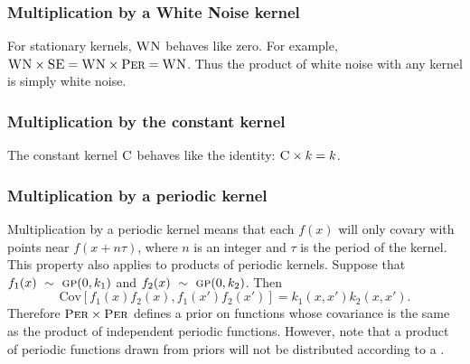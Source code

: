 \documentclass{article} %
\begin{document}
\subsubsection{Multiplication by a White Noise kernel}
\vspace{-0.08in}

For stationary kernels, ${\textsc{WN}}$ behaves like zero.  For example, ${\textsc{WN}} \times {\textsc{SE}} = {\textsc{WN}} \times {\textsc{Per}} = {\textsc{WN}}$.  Thus the product of white noise with any kernel is simply white noise.


\subsubsection{Multiplication by the constant kernel}
\vspace{-0.08in}

The constant kernel ${\textsc{C}}$ behaves like the identity: ${\textsc{C}} \times k = k$.


\subsubsection{Multiplication by a periodic kernel}
\vspace{-0.08in}

Multiplication by a periodic kernel means that each $f(x)$ will only covary with points near $f(x + n \tau)$, where $n$ is an integer and $\tau$ is the period of the kernel.
%
This property also applies to products of periodic kernels.
Suppose that ${f_1(x) \ \sim\  {\textsc{gp}}{}(0, k_1)}$ and ${f_2(x) \ \sim\  {\textsc{gp}}{}(0, k_2)}$.
Then
\begin{equation}
{\textrm{Cov} \left[f_1(x)f_2(x), f_1(x')f_2(x') \right] = k_1(x,x')k_2(x,x')}.
\end{equation}
Therefore ${\textsc{Per}} \times {\textsc{Per}}$ defines a prior on functions whose covariance is the same as the product of independent periodic functions.  However, note that a product of periodic functions drawn from \gp{} priors will not be distributed according to a \gp{}.

\end{document}
